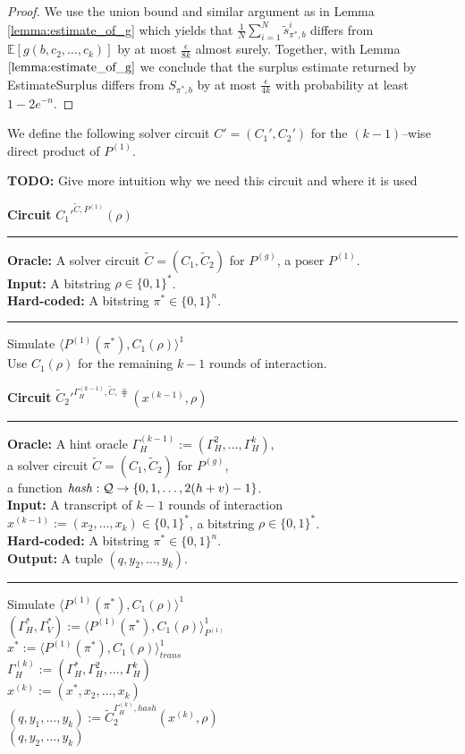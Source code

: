 \begin{proof}
We use the union bound and similar argument as in Lemma \ref{lemma:estimate_of_g}
which yields that $\frac{1}{N} \sum_{i=1}^{N} \widetilde{s}_{\pi^*,b}^i$ differs from
$\mathbb{E}[g(b, c_2, \dots, c_k)]$ by at most $\frac{\epsilon}{8k}$ almost surely. Together, with Lemma $\ref{lemma:estimate_of_g}$ we conclude that the surplus estimate
returned by EstimateSurplus differs from $S_{\pi^*,b}$ by at most $\frac{\epsilon}{4k}$ with probability at least $1 - 2e^{-n}$.
\end{proof}
%
We define the following solver circuit $C' = (C_1', C_2')$ for the $(k-1)$--wise direct product of $P^{(1)}$.
\begin{todo}
  \textbf{TODO:} Give more intuition why we need this circuit and where it is used
\end{todo}
\begin{codeblock}
  \textbf{Circuit} $C_1'^{\widetilde{C}, P^{(1)}}(\rho)$
  \medskip \hrule
  \textbf{Oracle:} A solver circuit $\widetilde{C} = (C_1, \widetilde{C}_2)$ for $P^{(g)}$, a poser $P^{(1)}$. \\
  \textbf{Input:}  A bitstring $\rho \in \{0,1\}^{*}$. \\
  \textbf{Hard-coded:} A bitstring $\pi^* \in \{0,1\}^{n}$.
  \medskip\hrule
  Simulate $\langle P^{(1)}(\pi^*), C_1(\rho)\rangle^1$ \\
  Use $C_1(\rho)$ for the remaining $k-1$ rounds of interaction.
\end{codeblock}
%
\begin{codeblock}
  \textbf{Circuit} $\widetilde{C}_2'^{\Gamma_H^{(k-1)}, \widetilde{C}, \hash}(x^{(k-1)}, \rho)$
  \medskip \hrule
  \textbf{Oracle:} A hint oracle $\Gamma_H^{(k-1)} := (\Gamma_H^{2}, \dots, \Gamma_H^{k})$,\\
  \IndII a solver circuit $\widetilde{C} = (C_1, \widetilde{C}_2)$ for $P^{(g)}$, \\
  \IndII a function $\operatorname{\mathit{hash}}: \mathcal{Q} \rightarrow \{0,1,\dots, 2(h+v)-1\}$. \\
  \textbf{Input:}  A transcript of $k-1$ rounds of interaction \\
  \IndII $x^{(k-1)} := (x_2, \dotsc, x_{k}) \in \{0,1\}^{*}$, a bitstring $\rho \in \{0,1\}^{*}$.\\
  \textbf{Hard-coded:} A bitstring $\pi^* \in \{0,1\}^{n}$. \\
  \textbf{Output:} A tuple $(q, y_2, \dots, y_k)$.
  \medskip\hrule
  Simulate $\langle P^{(1)}(\pi^*), C_1(\rho) \rangle^{1}$ \\
  \IndI $(\Gamma_H^*, \Gamma_V^*) := \langle P^{(1)}(\pi^*), C_1(\rho) \rangle^{1}_{P^{(1)}}$ \\
  \IndI $x^* := \langle P^{(1)}(\pi^*), C_1(\rho) \rangle^{1}_{\mathit{trans}}$ \\
  $\Gamma_H^{(k)} := (\Gamma_H^*, \Gamma_H^{2}, \dots, \Gamma_H^{k})$ \\
  $x^{(k)} := (x^*, x_2, \dots, x_{k})$ \\
  $(q, y_1, \dots, y_k) := \widetilde{C}_2^{\Gamma_H^{(k)}, \mathit{hash}}(x^{(k)}, \rho)$ \\
  \Return $(q, y_2, \dots, y_k)$
\end{codeblock}

